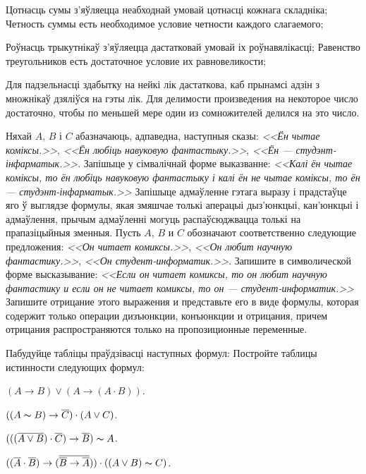 \begin{problemList}
\begin{belarusianEnumerate}
\problemItemSimple
{Цотнасць сумы з'яўляецца неабходнай умовай цотнасці кожнага складніка;}
{Четность суммы есть необходимое условие четности каждого слагаемого;}

\problemItemSimple
{Роўнасць трыкутнікаў з'яўляецца дастатковай умовай іх роўнавялікасці;}
{Равенство треугольников есть достаточное условие их равновеликости;}

\problemItemSimple
{Для падзельнасці здабытку на нейкі лік дастаткова, каб прынамсі адзін з множнікаў дзяліўся на гэты лік.}
{Для делимости произведения на некоторое число достаточно, чтобы по меньшей мере один из сомножителей делился на это число.}

\end{belarusianEnumerate}

\bigskip

\problemItemSimple
{Няхай $A$, $B$ і $C$ абазначаюць, адпаведна, наступныя сказы:
\textit{<<Ён чытае коміксы.>>},
\textit{<<Ён любіць навуковую фантастыку.>>},
\textit{<<Ён --- студэнт-інфарматык.>>}.
Запішыце у сімвалічнай форме выказванне: \textit{<<Калі ён чытае коміксы,
то ён любіць навуковую фантастыку і калі ён не чытае коміксы, то ён ---
студэнт-інфарматык.>>} Запішыце адмаўленне гэтага выразу і прадстаўце яго ў выглядзе формулы,
якая змяшчае толькі аперацыі дыз'юнкцыі, кан'юнкцыі і адмаўлення, прычым адмаўленні могуць распаўсюджвацца
толькі на прапазіцыйныя зменныя.}
{Пусть $A$, $B$ и $C$ обозначают соответственно следующие предложения:
\textit{<<Он читает комиксы.>>},
\textit{<<Он любит научную фантастику.>>},
\textit{<<Он студент-информатик.>>}.
Запишите в символической форме высказывание: \textit{<<Если он читает
комиксы, то он любит научную фантастику и если он не читает комиксы, то он ---
студент-информатик.>>} Запишите отрицание этого выражения и представьте
его в виде формулы, которая содержит только операции дизъюнкции, конъюнкции и
отрицания, причем отрицания распространяются только на пропозиционные переменные.}

\bigskip

\problemItemWithCommonPart
{Пабудуйце табліцы праўдзівасці наступных формул:}
{Постройте таблицы истинности следующих формул:}
{%
\begin{belarusianEnumerate}

\item $(A \to B) \vee (A \to (A \cdot B))$.
\item $((A \thicksim B) \to \overline{C}) \cdot (A \vee C)$.
\item $(((\overline{A \vee B}) \cdot \overline{C}) \to \overline{B}) \thicksim A$.
\item $((\overline{A} \cdot \overline{B}) \to (\overline{\overline{B} \to \overline{A}}))
\cdot ((A \vee B) \thicksim C)$.


\end{belarusianEnumerate}}
\end{problemList}
